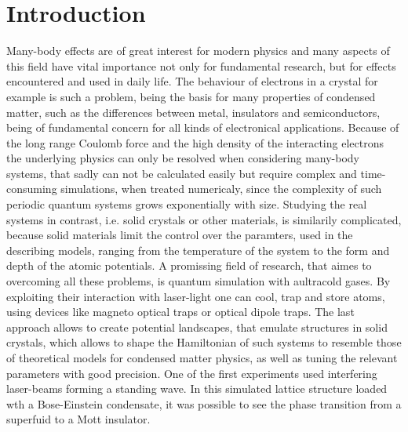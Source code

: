 \chapter{Introduction}

Many-body effects are of great interest for modern physics and many aspects of this field have vital importance not only for fundamental research, but for effects encountered and used in daily life. The behaviour of electrons in a crystal for example is such a problem, being the basis for many properties of condensed matter, such as the differences between metal, insulators and semiconductors, being of fundamental concern for all kinds of electronical applications. Because of the long range Coulomb force and the high density of the interacting electrons the underlying physics can only be resolved when considering many-body systems, that sadly can not be calculated easily but require complex and time-consuming simulations, when treated numericaly, since the complexity of such periodic quantum systems grows exponentially with size\cite{feynman}. Studying the real systems in contrast, i.e. solid crystals or other materials, is similarily complicated, because solid materials limit the control over the paramters, used in the describing models, ranging from the temperature of the system to the form and depth of the atomic potentials. A promissing field of research, that aimes to overcoming all these problems, is quantum simulation with aultracold gases. By exploiting their interaction with laser-light one can cool, trap and store atoms, using devices like magneto optical traps or optical dipole traps\cite{metcalf}. The last approach allows to create potential landscapes, that emulate structures in solid crystals, which allows to shape the Hamiltonian of such systems to resemble those of theoretical models for condensed matter physics, as well as tuning the relevant parameters with good precision\cite{bloch}. One of the first experiments used interfering laser-beams forming a standing wave. In this simulated lattice structure loaded wth a Bose-Einstein condensate, it was possible to see the phase transition from a superfuid to a Mott insulator\cite{greiner}.

